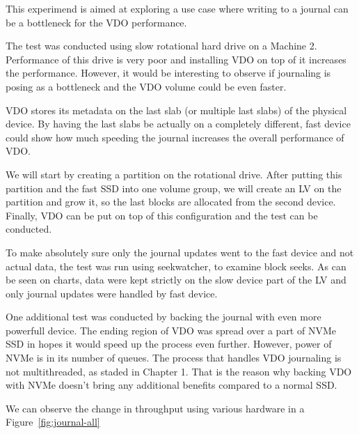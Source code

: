 \documentclass[
  color, %
  table, %
  lof,   %
  lot,   %
]{fithesis3}
\begin{document}
This experimend is aimed at exploring a use case where writing to a journal can be a bottleneck for the VDO performance.

The test was conducted using slow rotational hard drive on a Machine 2. Performance of this drive is very poor and installing VDO on top of it increases the performance. However, it would be interesting to observe if journaling is posing as a bottleneck and the VDO volume could be even faster.

VDO stores its metadata on the last slab (or multiple last slabs) of the physical device. By having the last slabs be actually on a completely different, fast device could show how much speeding the journal increases the overall performance of VDO.

We will start by creating a partition on the rotational drive. After putting this partition and the fast SSD into one volume group, we will create an LV on the partition and grow it, so the last blocks are allocated from the second device. Finally, VDO can be put on top of this configuration and the test can be conducted.

To make absolutely sure only the journal updates went to the fast device and not actual data, the test was run using seekwatcher, to examine block seeks. As can be seen on charts, data were kept strictly on the slow device part of the LV and only journal updates were handled by fast device.

One additional test was conducted by backing the journal with even more powerfull device. The ending region of VDO was spread over a part of NVMe SSD in hopes it would speed up the process even further. However, power of NVMe is in its number of queues. The process that handles VDO journaling is not multithreaded, as staded in Chapter 1. That is the reason why backing VDO with NVMe doesn't bring any additional benefits compared to a normal SSD.

We can observe the change in throughput using various hardware in a Figure~\ref{fig:journal-all}
\end{document}
